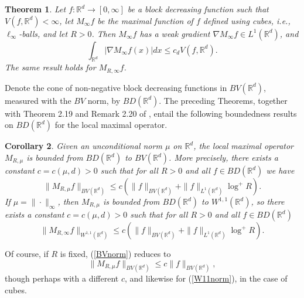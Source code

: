 \documentclass[12pt]{amsart}
\numberwithin{equation}{section}
\theoremstyle{plain}
\newtheorem{theorem}{Theorem}
\newtheorem{corollary}[theorem]{Corollary}
\theoremstyle{definition}
\theoremstyle{remark}
\begin{document}
\begin{theorem}\label{cubes}
Let $f:\mathbb{R}^d\to [0, \infty]$ be a block decreasing function
 such that $V(f,\mathbb{R}^d)<\infty$, let $M_\infty f$ be the
maximal function of $f$ defined using  cubes, i.e., $\ell_\infty$-balls, and let $R > 0$.
Then $M_\infty f$ has a weak gradient
$\nabla M_\infty f\in L^1(\mathbb{R}^d)$,
and
\begin{equation*}
    \int_{\mathbb{R}^d}\left|\nabla M_\infty f(x)\right|dx\le
    c_{d}V(f,\mathbb{R}^d).
  \end{equation*}
The same result holds for $M_{R,\infty} f$.
\end{theorem}

Denote the cone of non-negative block decreasing functions in $BV(\mathbb{R}^d)$, measured with the
$BV$ norm, by $BD (\mathbb{R}^d)$.
The preceding Theorems,  together with Theorem 2.19 and
Remark 2.20 of \cite{AlPe2}, entail the following boundedness
results on $BD (\mathbb{R}^d)$ for the local maximal operator.

\begin{corollary}\label{cor1}
 Given an unconditional norm $\mu$ on $\mathbb{R}^d$, the local maximal operator $M_{R,\mu}$ is bounded from
 $BD(\mathbb{R}^d)$ to $BV(\mathbb{R}^d)$. More precisely,
there exists a constant $c= c(\mu,d) > 0$ such that
 for all $R>0$ and all $f\in BD(\mathbb{R}^d)$ we have
\begin{equation}\label{BVnorm}
\|M_{R,\mu} f\|_{BV(\mathbb{R}^d)}\le
c\left(\|f\|_{BV(\mathbb{R}^d)} + \|f\|_{L^1 (\mathbb{R}^d)}\log^+ R \right).
\end{equation}
If $\mu=\|\cdot\|_\infty$, then $M_{R,\mu}$ is bounded from
 $BD(\mathbb{R}^d)$ to $W^{1,1}(\mathbb{R}^d)$, so
there exists a constant $c= c(\mu,d) > 0$ such that
 for all $R>0$ and all $f\in BD(\mathbb{R}^d)$
\begin{equation}\label{W11norm}
\|M_{R,\infty} f\|_{W^{1,1}(\mathbb{R}^d)}\le
c\left(\|f\|_{BV(\mathbb{R}^d)} + \|f\|_{L^1 (\mathbb{R}^d)} \log^+ R\right).
\end{equation}
\end{corollary}

Of course, if $R$ is fixed, (\ref{BVnorm}) reduces to
\begin{equation}\label{BVnorms}
\|M_{R,\mu} f\|_{BV(\mathbb{R}^d)}\le
c \|f\|_{BV(\mathbb{R}^d)},
\end{equation}
though perhaps with a different $c$, and likewise for (\ref{W11norm}), in the case
of cubes.
\end{document}

